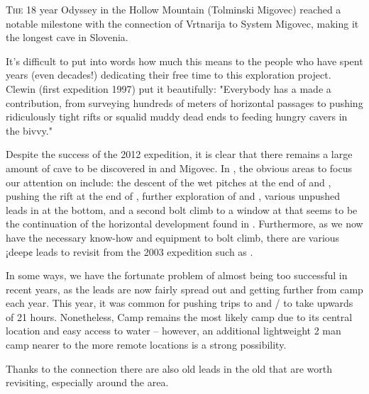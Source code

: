 \thispagestyle{endchapter}

\begin{tcolorbox}
\vspace{80pt}

\lettrine{T}{he} 18 year Odyssey in the Hollow Mountain (Tolminski Migovec) reached a notable milestone with the connection of Vrtnarija to System Migovec, making it the longest cave in Slovenia.

It's difficult to put into words how much this means to the people who have spent years (even decades!) dedicating their free time to this exploration project. Clewin (first expedition 1997) put it beautifully: "Everybody has a made a contribution, from surveying hundreds of meters of horizontal passages to pushing ridiculously tight rifts or squalid muddy dead ends to feeding hungry cavers in the bivvy."

Despite the success of the 2012 expedition, it is clear that there
remains a large amount of cave to be discovered in  and
Migovec. In , the obvious areas to focus our attention
on include: the descent of the wet pitches at the end of  and , pushing the rift at the end of , further exploration of  and ,
various unpushed leads in  at the bottom, and a
second bolt climb to a window at  that seems to
be the continuation of the horizontal development found in .
Furthermore, as we now have the necessary know-how and equipment to bolt
climb, there are various ¡deep¢ leads to revisit from the 2003
expedition such as .

In some ways, we have the fortunate problem of almost being too
successful in recent years, as the leads are now fairly spread out and
getting further from camp each year. This year, it was common for
pushing trips to  and
/ to take upwards of 21 hours.
Nonetheless, Camp  remains the most likely camp due to its
central location and easy access to water -- however, an additional
lightweight 2 man camp nearer to the more remote locations is a strong
possibility.

Thanks to the connection there are also old leads in the old  that
are worth revisiting, especially around the  area.




\end{tcolorbox}
\BgThispage